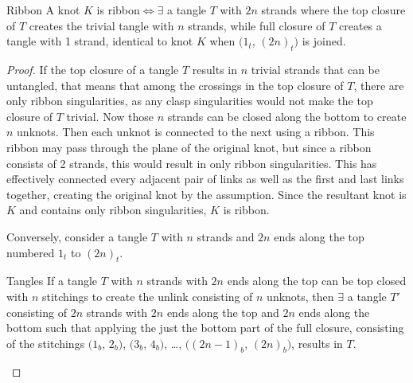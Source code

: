 \begin{paper}
\begin{papertheorem}{Ribbon}
A knot $K$ is ribbon$\iff\exists$ a tangle $T$ with $2n$ strands where the
top closure of $T$ creates the trivial tangle with $n$ strands, while
full closure of $T$ creates a tangle with 1 strand, identical to knot $K$ when
$(1_t$, $(2n)_t)$ is joined.
\end{papertheorem}
\begin{proof}
If the top closure of a tangle $T$ results in $n$ trivial strands that can be
untangled, that means that among the crossings in the top closure of $T$, there
are only ribbon singularities, as any clasp singularities would not make the top
closure of $T$ trivial.
Now those $n$ strands can be closed along the bottom to create $n$ unknots.
Then each unknot is connected to the next using a ribbon.
This ribbon may pass through the plane of the original knot, but since a ribbon
consists of 2 strands, this would result in only ribbon singularities.
This has effectively connected every adjacent pair of links as well as the first
and last links together, creating the original knot by the assumption.
Since the resultant knot is $K$ and contains only ribbon singularities, $K$ is
ribbon.

Conversely, consider a tangle $T$ with $n$ strands and $2n$ ends along the top
numbered $1_t$ to $(2n)_t$.
\begin{paperlemma}{Tangles}
If a tangle $T$ with $n$ strands with $2n$ ends along the top can be top closed
with $n$ stitchings to create the unlink consisting of $n$ unknots, then
$\exists$ a tangle $T'$ consisting of $2n$ strands with $2n$ ends along the top
and $2n$ ends along the bottom such that applying the just the bottom part of
the full closure, consisting of the stitchings $(1_b$, $2_b)$, $(3_b$, $4_b)$,
\dots, $((2n-1)_b$, $(2n)_b)$, results in $T$.


\end{paperlemma}
\end{proof}
\end{paper}
